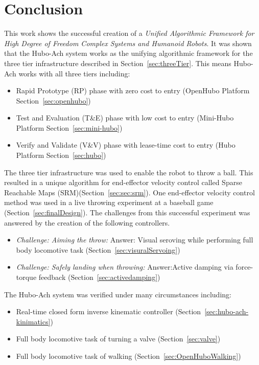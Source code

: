 \chapter{Conclusion}\label{sec:conclusion}
This work shows the successful creation of a \textit{Unified Algorithmic Framework for High Degree of Freedom Complex Systems and Humanoid Robots}.
It was shown that the Hubo-Ach system works as the unifying algorithmic framework for the three tier infrastructure described in Section~\ref{sec:threeTier}.
This means Hubo-Ach works with all three tiers including:
\begin{itemize}
\item Rapid Prototype (RP) phase with zero cost to entry (OpenHubo Platform Section~\ref{sec:openhubo})
\item Test and Evaluation (T\&E) phase with low cost to entry (Mini-Hubo Platform Section~\ref{sec:mini-hubo})
\item Verify and Validate (V\&V) phase with lease-time cost to entry (Hubo Platform Section~\ref{sec:hubo})
\end{itemize}

The three tier infrastructure was used to enable the robot to throw a ball.
This resulted in a unique algorithm for end-effector velocity control called Sparse Reachable Maps (SRM)(Section~\ref{sec:sec:srm}).
One end-effector velocity control method was used in a live throwing experiment at a baseball game (Section~\ref{sec:finalDesign}).
The challenges from this successful experiment was answered by the creation of the following controllers.
\begin{itemize}
	\item \textit{Challenge: Aiming the throw:} Answer: Visual seroving while performing full body locomotive task (Section~\ref{sec:visuralServoing})
	\item \textit{Challenge: Safely landing when throwing:} Answer:Active damping via force-torque feedback (Section~\ref{sec:activedamping})
\end{itemize}


The Hubo-Ach system was verified under many circumstances including:
\begin{itemize}
	\item Real-time closed form inverse kinematic controller (Section~\ref{sec:hubo-ach-kinimatics})
	\item Full body locomotive task of turning a valve (Section~\ref{sec:valve})
	\item Full body locomotive task of walking (Section~\ref{sec:OpenHuboWalking})
\end{itemize}

